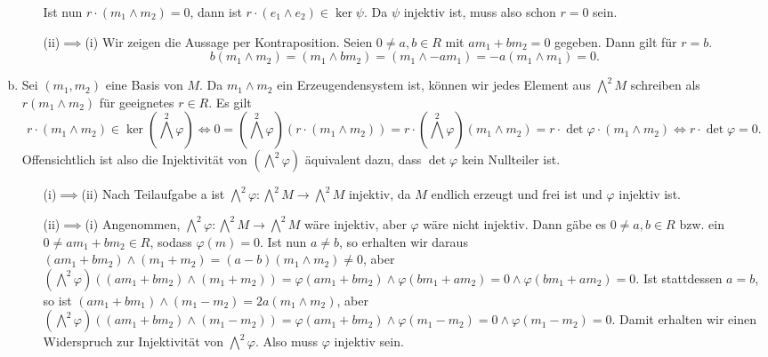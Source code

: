 \documentclass{article}
\theoremstyle{definition}
\newcommand{\equals}{\Longleftrightarrow}
\begin{document}
\begin{enumerate}[(a)]
\begin{itemize}
        Ist nun $r\cdot (m_1\wedge m_2) = 0$, dann ist $r\cdot (e_1\wedge e_2)\in \ker \psi$. Da $\psi$ injektiv ist, muss also schon $r = 0$ sein.
        \item[(ii)$\implies$(i)] Wir zeigen die Aussage per Kontraposition. Seien $0 \neq a,b\in R$ mit $am_1+ bm_2 = 0$ gegeben. Dann gilt für $r = b$.
        \[b(m_1\wedge m_2) = (m_1\wedge bm_2) = (m_1\wedge -am_1) = -a(m_1\wedge m_1) = 0.\]
    \end{itemize}
        \item Sei $(m_1,m_2)$ eine Basis von $M$. Da $m_1\wedge m_2$ ein Erzeugendensystem ist, können wir jedes Element aus $\textstyle{\bigwedge^2} M$ schreiben als $r (m_1\wedge m_2)$ für geeignetes $r\in R$. Es gilt \[r \cdot (m_1\wedge m_2) \in \ker (\textstyle{\bigwedge^2} \varphi) \equals 0 = (\textstyle{\bigwedge^2} \varphi)(r\cdot(m_1\wedge m_2)) = r \cdot (\textstyle{\bigwedge^2} \varphi)(m_1\wedge m_2) = r \cdot \det \varphi \cdot (m_1\wedge m_2) \equals r\cdot \det \varphi = 0.\]
        Offensichtlich ist also die Injektivität von $(\textstyle{\bigwedge^2} \varphi)$ äquivalent dazu, dass $\det \varphi$ kein Nullteiler ist.
        \begin{itemize}
            \item[(i)$\implies$(ii)] Nach Teilaufgabe a ist $\textstyle{\bigwedge^2}\varphi \colon \textstyle{\bigwedge^2} M \to \textstyle{\bigwedge^2} M$ injektiv, da $M$ endlich erzeugt und frei ist und $\varphi$ injektiv ist.
            \item[(ii)$\implies$(i)] Angenommen, $\textstyle{\bigwedge^2}\varphi \colon \textstyle{\bigwedge^2} M \to \textstyle{\bigwedge^2} M$ wäre injektiv, aber $\varphi$ wäre nicht injektiv. Dann gäbe es $0\neq a,b\in R$ bzw. ein $0\neq am_1 + bm_2\in R$, sodass $\varphi(m) = 0$. Ist nun $a \neq b$, so erhalten wir daraus $(am_1 + bm_2)\wedge (m_1 + m_2) = (a-b) (m_1\wedge m_2) \neq 0$, aber $(\textstyle{\bigwedge^2}\varphi)((am_1 + bm_2)\wedge (m_1 + m_2)) = \varphi(am_1 + bm_2) \wedge \varphi(bm_1 + am_2) = 0 \wedge \varphi(bm_1 + am_2) = 0$. Ist stattdessen $a = b$, so ist $(am_1 + bm_1)\wedge(m_1-m_2) = 2a(m_1\wedge m_2)$, aber $(\textstyle{\bigwedge^2}\varphi)((am_1 + bm_2)\wedge (m_1 - m_2)) = \varphi(am_1 + bm_2) \wedge \varphi(m_1 - m_2) = 0 \wedge \varphi(m_1 - m_2) = 0$. Damit erhalten wir einen Widerspruch zur Injektivität von $\textstyle{\bigwedge^2}\varphi$. Also muss  $\varphi$ injektiv sein.
        \end{itemize}
\end{enumerate}
\end{document}
